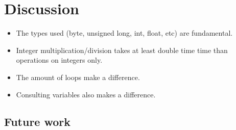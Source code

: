 
\section{Discussion}
\label{sec:discussion}


\begin{itemize}
    \item The types used (byte, unsigned long, int, float, etc) are
    fundamental.
    \item Integer multiplication/division takes at least double time time than
    operations on integers only.
    \item The amount of loops make a difference.
    \item Consulting variables also makes a difference.
\end{itemize}



\subsection{Future work}

